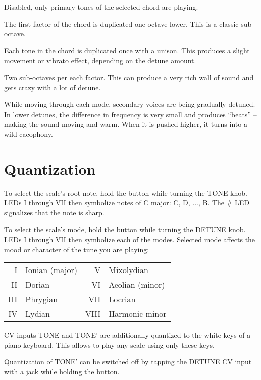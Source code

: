 \documentclass[10pt,nofoldmark,nocombine]{leaflet} %
\newenvironment{packed_enumerate_i}{
\begin{enumerate}[I]
  \setlength{\itemsep}{1pt}
  \setlength{\parskip}{0pt}
  \setlength{\parsep}{0pt}
}{\end{enumerate}}
\begin{document}
\begin{packed_enumerate_i}
  \item Disabled, only primary tones of the selected chord are playing.
  \item The first factor of the chord is duplicated one octave lower. This is a classic sub-octave.
  \item Each tone in the chord is duplicated once with a unison. This produces a slight movement or vibrato effect, depending on the detune amount.
  \item Two sub-octaves per each factor. This can produce a very rich wall of sound and gets crazy with a lot of detune.
\end{packed_enumerate_i}

While moving through each mode, secondary voices are being gradually detuned. In lower detunes, the difference in frequency is very small and produces ``beats'' -- making the sound moving and warm. When it is pushed higher, it turns into a wild cacophony.

\section{Quantization}

To select the scale's root note, hold the button while turning the TONE knob. LEDs I through VII then symbolize notes of C major: C, D, ..., B. The \# LED signalizes that the note is sharp.

To select the scale's mode, hold the button while turning the DETUNE knob. LEDs I through VII then symbolize each of the modes. Selected mode affects the mood or character of the tune you are playing:

\begin{tabular}{@{}rl@{}@{}rl@{}}
  I & Ionian (major) \hspace{15mm} & V & Mixolydian  \\
  II & Dorian & VI & Aeolian (minor) \\
  III & Phrygian & VII & Locrian \\
  IV & Lydian & VIII & Harmonic minor \\
\end{tabular}

CV inputs TONE and TONE' are additionally quantized to the white keys of a piano keyboard. This allows to play any scale using only these keys.

Quantization of TONE' can be switched off by tapping the DETUNE CV input with a jack while holding the button.
\end{document}
